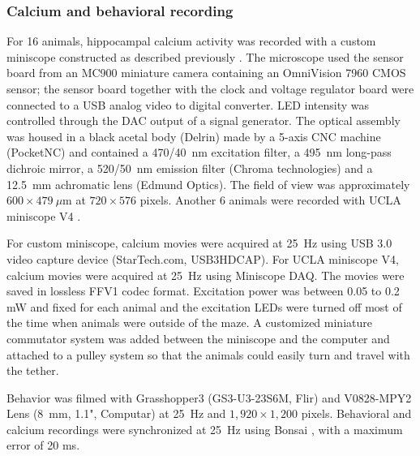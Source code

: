 \documentclass[fleqn,10pt]{wlscirep}
\begin{document}
\subsubsection*{Calcium and behavioral recording}

For 16 animals, hippocampal calcium activity was recorded with a custom miniscope constructed as described previously \cite{gonzalez_persistence_2019}. The microscope used the sensor board from an MC900 miniature camera containing an OmniVision 7960 CMOS sensor; the sensor board together with the clock and voltage regulator board were connected to a USB analog video to digital converter. LED intensity was controlled through the DAC output of a signal generator. The optical assembly was housed in a black acetal body (Delrin) made by a 5-axis CNC machine (PocketNC) and contained a 470/40~nm excitation filter, a 495~nm long-pass dichroic mirror, a 520/50~nm emission filter (Chroma technologies) and a 12.5~mm achromatic lens (Edmund Optics). The field of view was approximately $600\times479~\mu$m at $720\times576$ pixels. Another 6 animals were recorded with UCLA miniscope V4 \cite{aharoni_lab_and_ucla_miniscope_project_miniscope_nodate}.

For custom miniscope, calcium movies were acquired at 25~Hz using USB 3.0 video capture device (StarTech.com, USB3HDCAP). For UCLA miniscope V4, calcium movies were acquired at 25~Hz using Miniscope DAQ. The movies were saved in lossless FFV1 codec format. Excitation power was between 0.05 to 0.2 mW and fixed for each animal and the excitation LEDs were turned off most of the time when animals were outside of the maze. A customized miniature commutator system was added between the miniscope and the computer and attached to a pulley system so that the animals could easily turn and travel with the tether. 

Behavior was filmed with Grasshopper3 (GS3-U3-23S6M, Flir) and V0828-MPY2 Lens (8~mm, 1.1", Computar) at 25~Hz and $1,920 \times 1,200$ pixels. Behavioral and calcium recordings were synchronized at 25~Hz using Bonsai \cite{lopes_bonsai_2015}, with a maximum error of 20 ms. 


\end{document}
